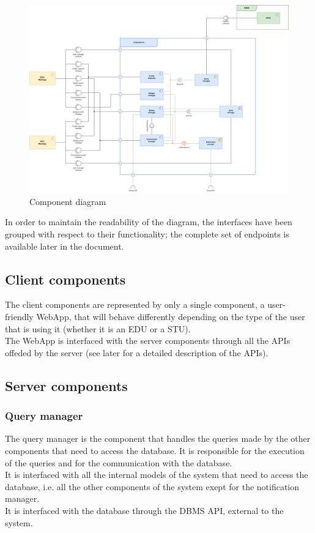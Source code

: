 \begin{figure}[H]
    \centering
    \includegraphics[width=\textwidth]{images/diagrams/component_diagram.png}
    \caption{Component diagram}
\end{figure}

In order to maintain the readability of the diagram, the interfaces have been grouped with respect to their functionality; the complete set of endpoints is available later in the document.\\

\subsection{Client components}

The client components are represented by only a single component, a user-friendly WebApp, that will behave differently depending on the type of the user that is using it (whether it is an EDU or a STU).\\
The WebApp is interfaced with the server components through all the APIs offeded by the server (see later for a detailed description of the APIs).\\

\subsection{Server components}

\subsubsection*{Query manager}
The query manager is the component that handles the queries made by the other components that need to access the database. It is responsible for the execution of the queries and for the communication with the database.\\
It is interfaced with all the internal models of the system that need to access the database, i.e. all the other components of the system exept for the notification manager.\\
It is interfaced with the database through the DBMS API, external to the system.

